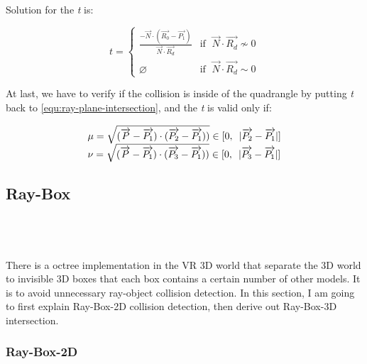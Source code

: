 Solution for the \emph{t} is:

\[
t =
\begin{cases}
\frac{-\overrightarrow{N} \cdot (\overrightarrow{R_0} - \overrightarrow{P_1})}{\overrightarrow{N} \cdot \overrightarrow{R_d}} & \text{if }\;\overrightarrow{N} \cdot \overrightarrow{R_d} \nsim 0 \\
\varnothing & \text{if }\;\overrightarrow{N} \cdot \overrightarrow{R_d} \sim 0
\end{cases}
\]

At last, we have to verify if the collision is inside of the quadrangle by putting \emph{t} back to \ref{equ:ray-plane-intersection}, and the \emph{t} is valid only if:

\[
\begin{array}{lr}
\mu = \sqrt{(\overrightarrow{P} - \overrightarrow{P_1}) \cdot (\overrightarrow{P_2} - \overrightarrow{P_1}))} \in [0,\enspace\lvert \overrightarrow{P_2} - \overrightarrow{P_1} \rvert] \\
\nu = \sqrt{(\overrightarrow{P} - \overrightarrow{P_1}) \cdot (\overrightarrow{P_3} - \overrightarrow{P_1}))} \in [0,\enspace\lvert \overrightarrow{P_3} - \overrightarrow{P_1} \rvert] 
\end{array}
\]

\subsection{Ray-Box}
\parencite{Williams.ray-box.2005} \\
\parencite{Tavian.ray-box-2d.2011} \\
\parencite{scratchapixel.ray-plane-3d} \\

There is a octree implementation in the VR 3D world that separate the 3D world to invisible 3D boxes that each box contains a certain number of other models. It is to avoid unnecessary ray-object collision detection. In this section, I am going to first explain Ray-Box-2D collision detection, then derive out Ray-Box-3D intersection.

\subsubsection{Ray-Box-2D}

